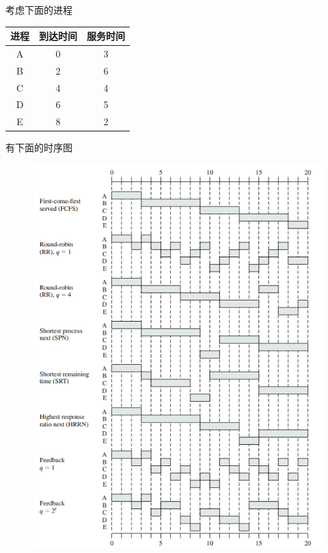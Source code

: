 \begin{example}
    考虑下面的进程
    \begin{center}
        \begin{tabular}{|c|c|c|}\hline
            进程 & 到达时间 & 服务时间\\\hline
            A & 0 & 3\\\hline
            B & 2 & 6\\\hline
            C & 4 & 4\\\hline
            D & 6 & 5\\\hline
            E & 8 & 2\\\hline
        \end{tabular}
    \end{center}
\end{example}
\begin{analysis}
    有下面的时序图
    \begin{figure}[H]
        \centering
        \includegraphics[width=0.8\linewidth]{fig/short-term-scheduling-all.png}
    \end{figure}
    \begin{figure}[H]
        \centering

\end{figure}
\end{analysis}
